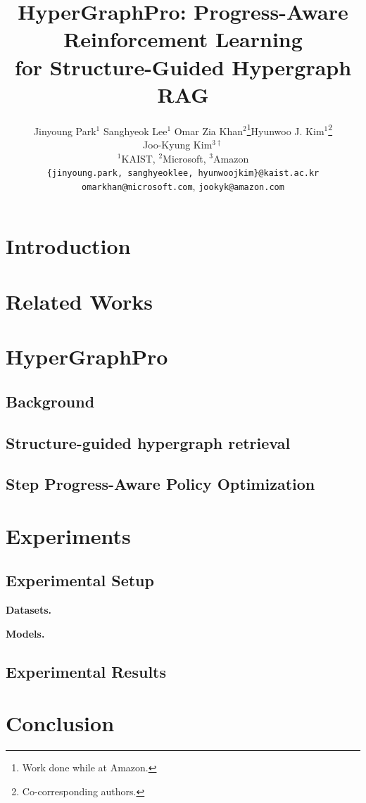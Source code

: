 \documentclass{article} %
\title{HyperGraphPro: Progress-Aware Reinforcement Learning \\ for Structure-Guided Hypergraph RAG}
\author{Jinyoung Park$^1$ \quad Sanghyeok Lee$^1$ \quad Omar Zia Khan$^2$\thanks{\hspace{0.5em} Work done while at Amazon.}\quad Hyunwoo J. Kim$^1$\thanks{\hspace{0.5em} Co-corresponding authors.} \\ Joo-Kyung Kim$^{3\dagger}$ \\
        $^1$KAIST,   $^2$Microsoft,   $^3$Amazon\\
        {\tt \{jinyoung.park, sanghyeoklee, hyunwoojkim\}@kaist.ac.kr} \\ {\tt  omarkhan@microsoft.com}, {\tt  jookyk@amazon.com}}
\begin{document}
\ifcolmsubmission
\linenumbers
\fi

\maketitle
\begin{abstract}

\end{abstract}


\section{Introduction}

\section{Related Works}

\section{HyperGraphPro}

\subsection{Background}

\subsection{Structure-guided hypergraph retrieval}
\label{sec:ret}

\subsection{Step Progress-Aware Policy Optimization}
\label{sec:po}

\section{Experiments}
\subsection{Experimental Setup}
\noindent\textbf{Datasets.}

\noindent\textbf{Models.}

\subsection{Experimental Results}

\section{Conclusion}



\end{document}
